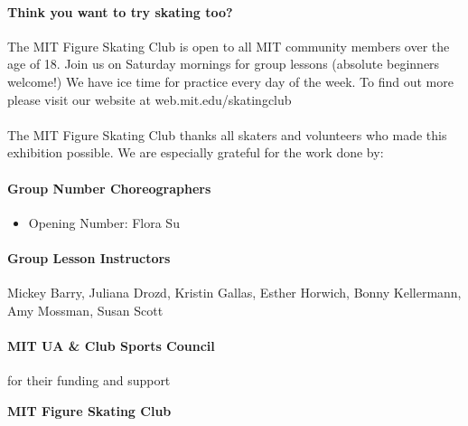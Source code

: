 \documentclass[12pt]{article}
\begin{document}
\begin{multicols*}{2}


\paragraph{Think you want to try skating too?} The MIT Figure Skating Club is open to all MIT community members over the age of 18. Join us on Saturday mornings for group lessons (absolute beginners welcome!) We have ice time for practice every day of the week. To find out more please visit our website at web.mit.edu/skatingclub

\paragraph{} The MIT Figure Skating Club thanks all skaters and volunteers who made this exhibition possible. We are especially grateful for the work done by:

\paragraph{Group Number Choreographers}
\begin{itemize}
    \item Opening Number: Flora Su
\end{itemize}

\paragraph{Group Lesson Instructors} Mickey Barry, Juliana Drozd, Kristin Gallas, Esther Horwich, Bonny Kellermann, Amy Mossman, Susan Scott
\paragraph{MIT UA \& Club Sports Council} for their funding and support

\vfill\null
\columnbreak


\begin{center}

\vspace*{1.5in}

\begin{Large}
{\bfseries
MIT Figure Skating Club
}
\end{Large}

\vspace{0.2in}


\end{center}
\end{multicols*}
\end{document}
